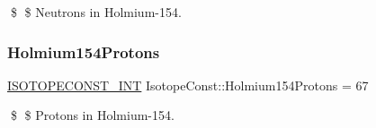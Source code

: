 \$ \$ Neutrons in Holmium-\/154. \mbox{\label{group___isotope_const-_holmium-_ho154_ga36f25ff9e1954130229cfe218cace0fb}} 
\subsubsection{\texorpdfstring{Holmium154\+Protons}{Holmium154Protons}}
{\footnotesize\ttfamily \mbox{\hyperlink{group___isotope_const-_macros_ga5f18360b3e99483a35c32d789e62621c}{I\+S\+O\+T\+O\+P\+E\+C\+O\+N\+S\+T\+\_\+\+I\+NT}} Isotope\+Const\+::\+Holmium154\+Protons = 67}

\$ \$ Protons in Holmium-\/154. 